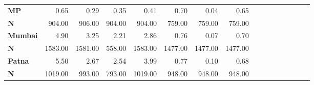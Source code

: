 \begin{tabular}{@{\extracolsep{5pt}}lrrrrrrrrrrrrrrr}
{\bf MP} & 0.65\phantom{***} & 0.29\phantom{***} & 0.35\phantom{***} & 0.41\phantom{***} & 0.70\phantom{***} & 0.04\phantom{***} & 0.65\phantom{***} \\
{\bf N} & 904.00\phantom{***} & 906.00\phantom{***} & 904.00\phantom{***} & 904.00\phantom{***} & 759.00\phantom{***} & 759.00\phantom{***} & 759.00\phantom{***} \\
{\bf Mumbai} & 4.90\phantom{***} & 3.25\phantom{***} & 2.21\phantom{***} & 2.86\phantom{***} & 0.76\phantom{***} & 0.07\phantom{***} & 0.70\phantom{***} \\
{\bf N} & 1583.00\phantom{***} & 1581.00\phantom{***} & 558.00\phantom{***} & 1583.00\phantom{***} & 1477.00\phantom{***} & 1477.00\phantom{***} & 1477.00\phantom{***} \\
{\bf Patna} & 5.50\phantom{***} & 2.67\phantom{***} & 2.54\phantom{***} & 3.99\phantom{***} & 0.77\phantom{***} & 0.10\phantom{***} & 0.68\phantom{***} \\
{\bf N} & 1019.00\phantom{***} & 993.00\phantom{***} & 793.00\phantom{***} & 1019.00\phantom{***} & 948.00\phantom{***} & 948.00\phantom{***} & 948.00\phantom{***} \\
\hline
\end{tabular}
